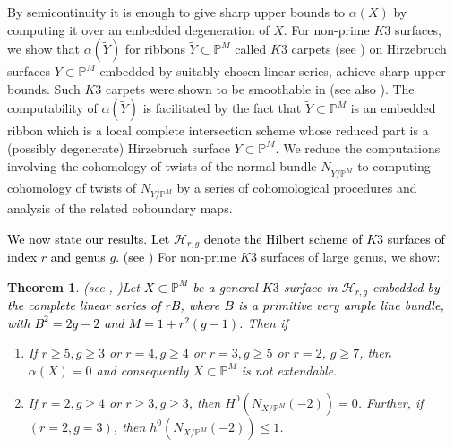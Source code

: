 \documentclass[11pt,twoside]{amsart}
\theoremstyle{plain}
\numberwithin{equation}{section}
\newtheorem{theorem}{Theorem}[section]
\theoremstyle{definition}
\begin{document}
By semicontinuity it is enough to give sharp upper bounds to $\alpha(X)$ by computing it over an embedded degeneration of $X$. For non-prime $K3$ surfaces, we show that $\alpha(\widetilde{Y})$ for ribbons $\widetilde{Y} \subset \mathbb{P}^M$ called $K3$ carpets (see ) on Hirzebruch surfaces $Y \subset \mathbb{P}^M$ embedded by suitably chosen linear series, achieve sharp upper bounds. Such $K3$ carpets were shown to be smoothable in \cite{BMR21} (see also \cite{GP97}). The computability of $\alpha(\widetilde{Y})$ is facilitated by the fact that $\widetilde{Y} \subset \mathbb{P}^M$ is an embedded ribbon which is a local complete intersection scheme whose reduced part is a (possibly degenerate) Hirzebruch surface $Y \subset \mathbb{P}^M$. %
We reduce the computations involving the cohomology of twists of the normal bundle $N_{\widetilde{Y}/\mathbb{P}^M}$ to computing cohomology of twists of $N_{Y/\mathbb{P}^M}$ by a series of cohomological procedures and analysis of the related coboundary maps. \par


\textcolor{black}{We now state our results. Let $\mathcal{H}_{r,g}$ denote the Hilbert scheme of $K3$ surfaces of index $r$ and genus $g$. (see )}
For non-prime $K3$ surfaces of large genus, we show:

\begin{theorem}(see , )\label{non-extendability of K3 surfaces intro}
    Let \textcolor{black}{$X \subset \mathbb{P}^{M}$ be a general $K3$ surface in $\mathcal{H}_{r,g}$ embedded by the complete linear series of $rB$, where $B$ is a primitive very ample line bundle, with $B^2 = 2g-2$ and $M = 1+r^2(g-1)$.}
    Then if
    \begin{enumerate}
        \item[(1)] If $r \geq 5, g \geq 3$ or $r = 4, g \geq 4$ or $r = 3, g \geq 5$ or $r = 2$, $g \geq 7$, then $\alpha(X) = 0$ and consequently $X \subset \mathbb{P}^M$ is not extendable. 

        
        \item[(2)] If $r = 2, g \geq 4$ or $r \geq 3, g \geq 3$, then $H^0(N_{X/\mathbb{P}^M}(-2)) = 0$. Further, if $(r = 2, g = 3)$, then $h^0(N_{X/\mathbb{P}^M}(-2)) \leq 1$.
        
        
    \end{enumerate}
\end{theorem}
\end{document}
